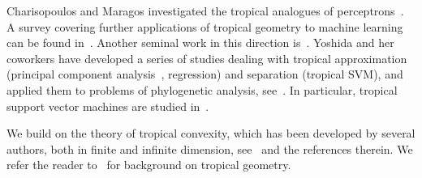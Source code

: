 \documentclass{article}
\begin{document}
Charisopoulos and Maragos investigated the tropical analogues
of perceptrons~\cite{Charisopoulos2017}.
A survey covering further applications of tropical geometry to machine learning
can be found in~\cite{maragos2021}. Another seminal work in this direction is~\cite{zhang2018}.
Yoshida and her coworkers have developed a series of studies
dealing with tropical approximation (principal component analysis~\cite{yoshida2019},
regression)
and separation (tropical SVM), and applied them to problems of phylogenetic analysis,
see~\cite{monod2022}. In particular, tropical support vector machines are studied
in~\cite{tang2020,Yoshida2023}.

We build on the theory of tropical convexity,
which has been developed by several authors,
both in finite and infinite dimension, see~\cite{Litvinov2001,develin2004,cohen2004} and the references therein.
We refer the reader to~\cite{maclagan2015} for background
on tropical geometry.

\end{document}
